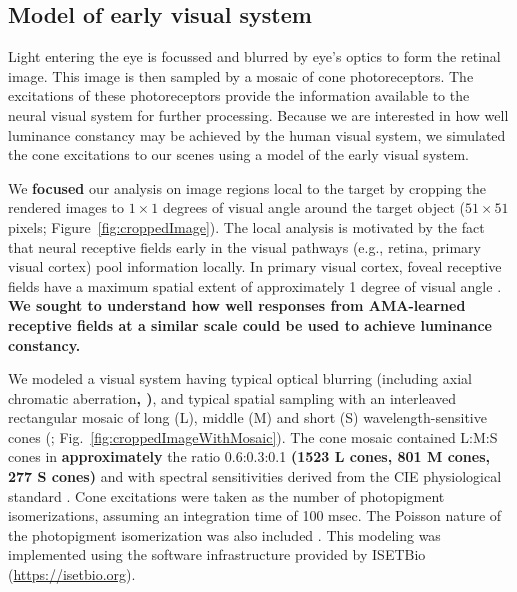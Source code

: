 \documentclass{jov}
\providecommand{\DIFaddtex}[1]{{\bf #1}} %
\providecommand{\DIFdeltex}[1]{} %
\providecommand{\DIFaddbegin}{} %
\providecommand{\DIFaddend}{} %
\providecommand{\DIFdelbegin}{} %
\providecommand{\DIFdelend}{} %
\providecommand{\DIFadd}[1]{\texorpdfstring{\DIFaddtex{#1}}{#1}} %
\providecommand{\DIFdel}[1]{\texorpdfstring{\DIFdeltex{#1}}{}} %
\newcommand{\DIFscaledelfig}{0.5}
\newlength{\DIFdelgraphicswidth} %
\newlength{\DIFdelgraphicsheight} %
\newcommand{\DIFaddincludegraphics}[2][]{{\color{blue}\fbox{\DIFOincludegraphics[#1]{#2}}}} %
\newcommand{\DIFdelincludegraphics}[2][]{%
\sbox{\DIFdelgraphicsbox}{\DIFOincludegraphics[#1]{#2}}%
\settoboxwidth{\DIFdelgraphicswidth}{\DIFdelgraphicsbox} %
\settoboxtotalheight{\DIFdelgraphicsheight}{\DIFdelgraphicsbox} %
\scalebox{\DIFscaledelfig}{%
\parbox[b]{\DIFdelgraphicswidth}{\usebox{\DIFdelgraphicsbox}\\[-\baselineskip] \rule{\DIFdelgraphicswidth}{0em}}\llap{\resizebox{\DIFdelgraphicswidth}{\DIFdelgraphicsheight}{%
\setlength{\unitlength}{\DIFdelgraphicswidth}%
\begin{picture}(1,1)%
\thicklines\linethickness{2pt} %
{\color[rgb]{1,0,0}\put(0,0){\framebox(1,1){}}}%
{\color[rgb]{1,0,0}\put(0,0){\line( 1,1){1}}}%
{\color[rgb]{1,0,0}\put(0,1){\line(1,-1){1}}}%
\end{picture}%
}\hspace*{3pt}}} %
} %
\DeclareRobustCommand{\DIFaddbegin}{\DIFOaddbegin \let\includegraphics\DIFaddincludegraphics} %
\DeclareRobustCommand{\DIFaddend}{\DIFOaddend \let\includegraphics\DIFOincludegraphics} %
\DeclareRobustCommand{\DIFdelbegin}{\DIFOdelbegin \let\includegraphics\DIFdelincludegraphics} %
\DeclareRobustCommand{\DIFdelend}{\DIFOaddend \let\includegraphics\DIFOincludegraphics} %
\begin{document}
\subsection{Model of early visual system} \label{method:Isetbio}
Light entering the eye is focussed and blurred by eye's optics to form the retinal image.
This image is then sampled by a mosaic of cone photoreceptors.
The excitations of these photoreceptors provide the information available to the neural visual system for further processing.
Because we are interested in how well luminance constancy may be achieved by the human visual system, we simulated the cone excitations
to our scenes using a model of the early visual system.

We \DIFdelbegin \DIFdel{focussed }\DIFdelend \DIFaddbegin \DIFadd{focused }\DIFaddend our analysis on image regions local to the target by cropping the rendered images to $1 \times 1$ degrees of visual angle around the target object ($51 \times 51$ pixels; Figure~\ref{fig:croppedImage}).
The local analysis is motivated by the fact that neural receptive fields early in the visual pathways (e.g., retina, primary visual cortex) pool information locally. 
In primary visual cortex, foveal receptive fields have a maximum spatial extent of approximately 1 degree of visual angle \cite{gattass1981visual, gattass1988visuotopic}. 
\DIFaddbegin \DIFadd{We sought to understand how well responses from AMA-learned receptive fields at a similar scale could be used to achieve luminance constancy.
}\DIFaddend 

We modeled a visual system having typical optical blurring (including axial chromatic aberration\DIFdelbegin \DIFdel{)\cite{marimont1994matching}}\DIFdelend \DIFaddbegin \DIFadd{, )}\DIFaddend , and typical spatial sampling with an interleaved rectangular mosaic of long (L), middle (M)  and short (S) wavelength-sensitive cones (; Fig.~\ref{fig:croppedImageWithMosaic}). 
The cone mosaic contained L:M:S cones in \DIFaddbegin \DIFadd{approximately }\DIFaddend the ratio 0.6:0.3:0.1 \DIFaddbegin \DIFadd{(1523 L cones, 801 M cones, 277 S cones) }\DIFaddend and with spectral sensitivities derived from the CIE physiological standard \cite{CIE86}.
Cone excitations were taken as the number of photopigment isomerizations, assuming an integration time of 100 msec. 
The Poisson nature of the photopigment isomerization was also included \cite{hecht1942energy}. 
This modeling was implemented using the software infrastructure provided by ISETBio (\href{https://isetbio.org}{https://isetbio.org}).
\end{document}
